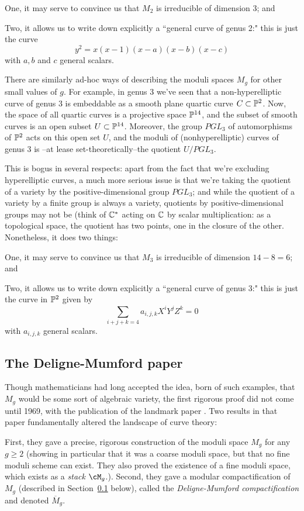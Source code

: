 One, it may serve to convince us that $M_2$ is irreducible of dimension 3; and

Two, it allows us to write down explicitly a ``general curve of genus 2:" this is just the curve
$$
y^2 = x(x-1)(x-a)(x-b)(x-c)
$$
with $a, b$ and $c$ general scalars.

There are similarly ad-hoc ways of describing the moduli spaces $M_g$ for other small values of $g$. For example, in genus 3 we've seen that a non-hyperelliptic curve of genus 3 is embeddable as a smooth plane quartic curve $C \subset \PP^2$. Now, the space of all quartic curves is a projective space $\PP^{14}$, and the subset of smooth curves is an open subset $U \subset \PP^{14}$. Moreover, the group $PGL_3$ of automorphisms of $\PP^2$ acts on this open set $U$, and  the moduli of (nonhyperelliptic) curves of genus 3 is --at lease set-theoretically--the quotient $U/PGL_3$.

This is bogus in several respects: apart from the fact that we're excluding hyperelliptic curves, a much more serious issue is that we're taking the quotient of a variety by the positive-dimensional group $PGL_3$; and while the quotient of a variety by a finite group is always a variety, quotients by positive-dimensional groups may not be (think of $\CC^*$ acting on $\CC$ by scalar multiplication: as a topological space, the quotient has two points, one in the closure of the other.  Nonetheless, it does two things:

One, it may serve to convince us that $M_3$ is irreducible of dimension $14-8 = 6$; and

Two, it allows us to write down explicitly a ``general curve of genus 3:" this is just the curve in $\PP^2$ given by
$$
\sum_{i+j+k = 4} a_{i,j,k} X^iY^jZ^k = 0
$$
with $a_{i,j,k}$ general scalars.

\subsection{The Deligne-Mumford paper}

Though mathematicians had long accepted the idea, born of such examples, that $M_g$ would be some sort of algebraic variety, the first rigorous proof did not come until 1969, with the publication of the landmark paper \cite{Deligne-Mumford}. Two results in that paper fundamentally altered the landscape of curve theory:

First, they gave a precise, rigorous construction of the moduli space $M_g$ for any $g \geq 2$ (showing in particular that it was a coarse moduli space, but that no fine moduli scheme can exist. They also proved the existence of a fine moduli space, which exists as a \emph{ stack} $\cM_g$.). Second, they gave a modular compactification of $M_g$ (described in Section~\ref{} below), called the \emph{Deligne-Mumford compactification} and denoted $\overline M_g$. 

